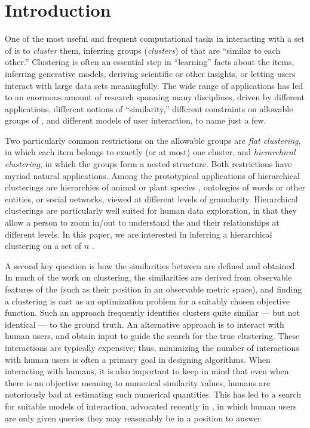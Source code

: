 
\section{Introduction} \label{sec:introduction}

One of the most useful and frequent computational tasks
in interacting with a set of \elements is to \emph{cluster} them,
inferring groups (\emph{clusters}) of \elements
that are ``similar to each other.''
Clustering is often an essential step in ``learning'' facts
about the items, inferring generative models,
deriving scientific or other insights,
or letting users interact with large data sets meaningfully.
The wide range of applications has led to an enormous amount of research
spanning many disciplines, driven by different applications,
different notions of ``similarity,'' different constraints
on allowable groups of \elements,
and different models of user interaction,
to name just a few.

Two particularly common restrictions
on the allowable groups are \emph{flat clustering},
in which each item belongs to exactly (or at most) one cluster,
and \emph{hierarchical clustering},
in which the groups form a nested structure.
Both restrictions have myriad natural applications.
Among the prototypical applications of hierarchical clusterings 
are hierarchies of animal or plant species
\cite{felsenstein:2004:phylogenies},
ontologies of words or other entities,
or social networks, viewed at different levels of granularity.
Hierarchical clusterings are particularly well suited
for human data exploration, in that they allow a person
to zoom in/out to understand the \elements and their relationships
at different levels. In this paper, we are interested in
inferring a hierarchical clustering
on a set \AllElements of $n$ \elements.

A second key question is how the similarities between \elements
are defined and obtained.
In much of the work on clustering, the similarities are derived
from observable features of the \elements
(such as their position in an observable metric space),
and finding a clustering is cast as
an optimization problem for a suitably chosen objective function.
Such an approach frequently identifies clusters quite similar
--- but not identical --- to the ground truth.
An alternative approach is to interact with human users,
and obtain input to guide the search for the true clustering.
These interactions are typically expensive;
thus, minimizing the number of interactions with human users
is often a primary goal in designing algorithms. 
When interacting with humans, it is also important to keep in mind
that even when there is an objective meaning to numerical similarity values,
humans are notoriously bad at estimating such numerical quantities.
This has led to a search for suitable models of interaction,
advocated recently in
\cite{balcan-blum:2008:split-merge,%
awasthi-zadeh:2010:supervised-clustering,%
awasthi-balcan-voevodski:2017:local-algorithm-journal,%
vikram-dasgupta:2016:interactive-hierarchical-clustering},
in which human users are only given queries
they may reasonably be in a position to answer.

